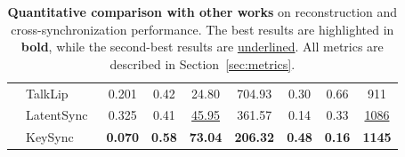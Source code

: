 \begin{table}[ht]
\begin{tabular}{llccccccc}
\multicolumn{1}{c}{}                      & TalkLip~\cite{talklip}    & 0.201  &  0.42  & 24.80  &704.93   &  0.30  &  0.66      &    911    \\
& LatentSync~\cite{latentsync}   & 0.325  &  0.41     & \underline{45.95}  &361.57   & 0.14   &    0.33   &   \underline{1086}    \\ 
\multicolumn{1}{c}{}                      & \cellcolor{cvprblue!40}KeySync &  \cellcolor{cvprblue!40}\textbf{0.070}
 &  \cellcolor{cvprblue!40}\textbf{0.58}  &  \cellcolor{cvprblue!40}\textbf{73.04} & \cellcolor{cvprblue!40}\textbf{206.32}  &  \cellcolor{cvprblue!40}\textbf{0.48}    & \cellcolor{cvprblue!40}\textbf{0.16}   & \cellcolor{cvprblue!40}\textbf{1145}  \\ 
                                         \bottomrule
\end{tabular}

\caption{\textbf{Quantitative comparison with other works} on reconstruction and cross-synchronization performance. The best results are highlighted in \textbf{bold}, while the second-best results are \underline{underlined}. All metrics are described in Section~\ref{sec:metrics}.
}
\label{tab:metrics_comparison}
\end{table}